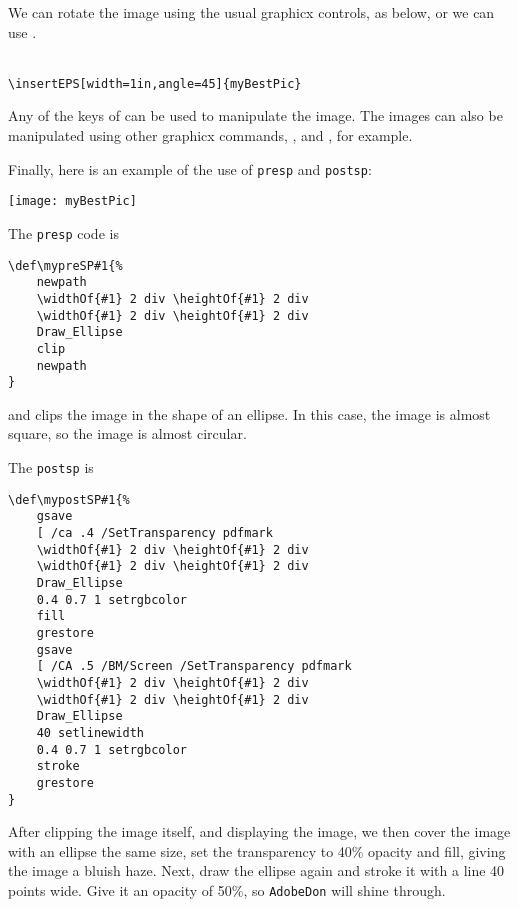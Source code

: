 \documentclass{article}
\begin{document}
We can rotate the image using the usual graphicx controls, as below, or we can
use .

\begin{center}
\\
\small\verb!\insertEPS[width=1in,angle=45]{myBestPic}!
\end{center}

Any of the keys of  can be used to manipulate
the image. The images can also be manipulated using other graphicx
commands, ,  and , for
example.

Finally, here is an example of the use of \texttt{presp} and \texttt{postsp}:

\def\mypreSP#1{%
    newpath
    \widthOf{#1} 2 div \heightOf{#1} 2 div
    \widthOf{#1} 2 div \heightOf{#1} 2 div
    Draw_Ellipse
    clip
    newpath
}
\def\mypostSP#1{%
    gsave
    [ /ca .4 /SetTransparency pdfmark
    \widthOf{#1} 2 div \heightOf{#1} 2 div
    \widthOf{#1} 2 div \heightOf{#1} 2 div
    Draw_Ellipse
    0.4 0.7 1 setrgbcolor
    fill
    grestore
    gsave
    [ /CA .5 /BM/Screen /SetTransparency pdfmark
    \widthOf{#1} 2 div \heightOf{#1} 2 div
    \widthOf{#1} 2 div \heightOf{#1} 2 div
    Draw_Ellipse
    40 setlinewidth
    0.4 0.7 1 setrgbcolor
    stroke
    grestore
}

\begin{center}
\texttt{[image: myBestPic]}
\end{center}
The \texttt{presp} code is

\begin{Verbatim}[fontsize=\small]
\def\mypreSP#1{%
    newpath
    \widthOf{#1} 2 div \heightOf{#1} 2 div
    \widthOf{#1} 2 div \heightOf{#1} 2 div
    Draw_Ellipse
    clip
    newpath
}
\end{Verbatim}
and clips the image in the shape of an ellipse. In this case, the
image is almost square, so the image is almost circular.

The \texttt{postsp} is

\begin{Verbatim}
\def\mypostSP#1{%
    gsave
    [ /ca .4 /SetTransparency pdfmark
    \widthOf{#1} 2 div \heightOf{#1} 2 div
    \widthOf{#1} 2 div \heightOf{#1} 2 div
    Draw_Ellipse
    0.4 0.7 1 setrgbcolor
    fill
    grestore
    gsave
    [ /CA .5 /BM/Screen /SetTransparency pdfmark
    \widthOf{#1} 2 div \heightOf{#1} 2 div
    \widthOf{#1} 2 div \heightOf{#1} 2 div
    Draw_Ellipse
    40 setlinewidth
    0.4 0.7 1 setrgbcolor
    stroke
    grestore
}
\end{Verbatim}
After clipping the image itself, and displaying the image, we then
cover the image with an ellipse the same size, set the transparency
to 40\% opacity and fill, giving the image a bluish haze. Next, draw
the ellipse again and stroke it with a line 40 points wide. Give it an
opacity of 50\%, so \texttt{AdobeDon} will shine through.
\end{document}
